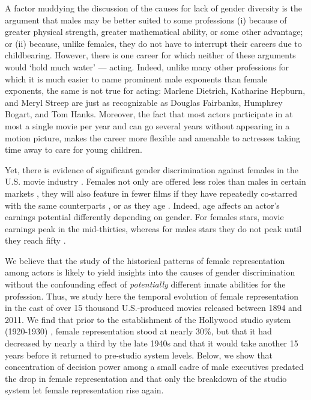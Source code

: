 A factor muddying the discussion of the causes for lack of gender diversity is the argument that males may be better suited to some professions (i) because of greater physical strength, greater mathematical ability, or some other advantage; or (ii) because, unlike females, they do not have to interrupt their careers due to childbearing. However, there is one career for which neither of these arguments would `hold much water' --- acting. Indeed, unlike many other professions for which it is much easier to name prominent male exponents than female exponents, the same is not true for acting: Marlene Dietrich, Katharine Hepburn, and Meryl Streep are just as recognizable as Douglas Fairbanks, Humphrey Bogart, and Tom Hanks. Moreover, the fact that most actors participate in at most a single movie per year and can go several years without appearing in a motion picture, makes the career more flexible and amenable to actresses taking time away to care for young children.

Yet, there is evidence of significant gender discrimination against females in the U.S. movie industry \cite{Smith2014,DePater2014,Smith2017}. Females not only are offered less roles than males in certain markets \cite{Dean2008}, they will also feature in fewer films if they have repeatedly co-starred with the same counterparts \cite{Lutter2013}, or as they age \cite{Bazzini1997,Lincoln2004}. Indeed, age affects an actor's earnings potential differently depending on gender. For females stars, movie earnings peak in the mid-thirties, whereas for males stars they do not peak until they reach fifty \cite{DePater2014}.

We believe that the study of the historical patterns of female representation among actors is likely to yield insights into the causes of gender discrimination without the confounding effect of \textit{potentially} different innate abilities for the profession. Thus, we study here the temporal evolution of female representation in the cast of over 15 thousand U.S.-produced movies released between 1894 and 2011. We find that prior to the establishment of the Hollywood studio system (1920-1930) \cite{Deutelbaum1989}, female representation stood at nearly 30\%, but that it had decreased by nearly a third by the late 1940s and that it would take another 15 years before it returned to pre-studio system levels. Below, we show that concentration of decision power among a small cadre of male executives predated the drop in female representation and that only the breakdown of the studio system let female representation rise again.

